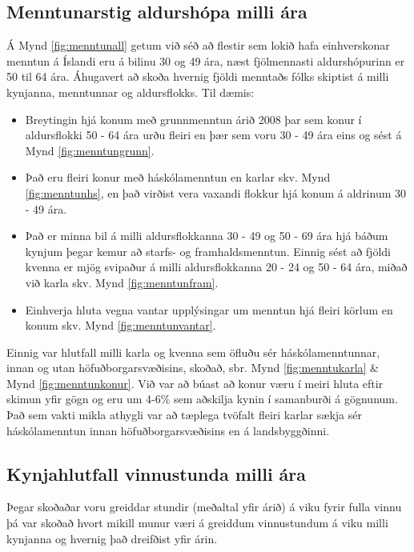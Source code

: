 \documentclass[12pt, git, draft]{rureport}
\begin{document}
\subsection{Menntunarstig aldurshópa milli ára}
Á Mynd \ref{fig:menntunall} getum við séð að flestir sem lokið hafa einhverskonar menntun á Íslandi eru á bilinu 30 og 49 ára, næst fjölmennasti aldurshópurinn er 50 til 64 ára.
Áhugavert að skoða hvernig fjöldi menntaðs fólks skiptist á milli kynjanna, menntunnar og aldursflokks. Til dæmis:
\begin{itemize}  
	
	\item Breytingin hjá konum með grunnmenntun árið 2008 þar sem konur í aldursflokki 50 - 64 ára urðu fleiri en þær sem voru 30 - 49 ára eins og sést á Mynd \ref{fig:menntungrunn}.
	
	\item Það eru fleiri konur með háskólamenntun en karlar skv. Mynd \ref{fig:menntunhs}, en það virðist vera vaxandi flokkur hjá konum á aldrinum 30 - 49 ára.
	
	
	\item Það er minna bil á milli aldursflokkanna 30 - 49 og 50 - 69 ára hjá báðum kynjum þegar kemur að starfs- og framhaldsmenntun. Einnig sést að fjöldi kvenna er mjög svipaður á milli aldursflokkanna 20 - 24 og 50 - 64 ára, miðað við karla skv. Mynd \ref{fig:menntunfram}.
	
	\item Einhverja hluta vegna vantar upplýsingar um menntun hjá fleiri körlum en konum skv. Mynd \ref{fig:menntunvantar}.
	
\end{itemize}
Einnig var hlutfall milli karla og kvenna sem öfluðu sér háskólamenntunnar, innan og utan höfuðborgarsvæðisins, skoðað, sbr. Mynd \ref{fig:menntukarla} \& Mynd \ref{fig:menntunkonur}. Við var að búast að konur væru í meiri hluta eftir skimun yfir gögn og eru um 4-6\% sem aðskilja kynin í samanburði á gögnunum. Það sem vakti mikla athygli var að tæplega tvöfalt fleiri karlar sækja sér háskólamenntun innan höfuðborgarsvæðisins en á landsbyggðinni.



\subsection{Kynjahlutfall vinnustunda milli ára}
Þegar skoðaðar voru greiddar stundir (meðaltal yfir árið) á viku fyrir fulla vinnu þá var skoðað hvort mikill munur væri á greiddum vinnustundum á viku milli kynjanna og hvernig það dreifðist yfir árin. 
\end{document}
